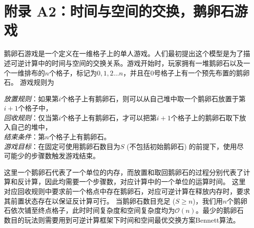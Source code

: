 \documentclass[A4,twoside,UTF8]{ctexart}
\newcommand{\bigO}{{\mathcal{O}}}
\begin{document}
\section*{附录 A2：时间与空间的交换，鹅卵石游戏}\label{sec:pebblegame}
鹅卵石游戏是一个定义在一维格子上的单人游戏。人们最初提出这个模型是为了描述可逆计算中的时间与空间的交换关系。游戏开始时，玩家拥有一堆鹅卵石以及一个一维排布的$n$个格子，标记为$0,1,2\ldots n$，并且在$0$号格子上有一个预先布置的鹅卵石。
游戏规则为
\begin{tcolorbox}[width=\textwidth, title=鹅卵石游戏-可逆计算版本]
    \textit{放置规则}：如果第$i$个格子上有鹅卵石，则可以从自己堆中取一个鹅卵石放置于第$i+1$个格子中，\\
    \textit{回收规则}：仅当第$i$个格子上有鹅卵石，才可以把第$i+1$个格子上的鹅卵石取下放入自己的堆中，\\
    \textit{结束条件}：第$n$个格子上有鹅卵石。\\
    \textit{游戏目标}：在固定可使用鹅卵石数目为$S$ (不包括初始鹅卵石) 的前提下，使用尽可能少的步骤数触发游戏结束。
\end{tcolorbox}
这里一个鹅卵石代表了一个单位的内存，而放置和取回鹅卵石的过程分别代表了计算和反计算，因此均需要一个步骤数，对应计算中的一个单位的运算时间。
这里对应回收规则中要求前一个格点中存在鹅卵石，对应可逆计算在释放内存时，要求其前置状态存在以保证反计算可行。
当鹅卵石数目充足 ($S\geq n$)，我们用$n$个鹅卵石依次铺至终点格子，此时时间复杂度和空间复杂度均为$\bigO(n)$。最少的鹅卵石数目的玩法则需要用到可逆计算框架下时间和空间最优交换方案Bennett算法。
\end{document}
